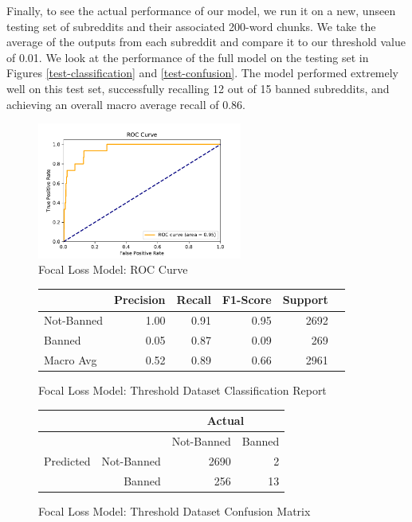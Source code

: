 \documentclass[11pt]{article}[twocolumn]
\begin{document}
Finally, to see the actual performance of our model, we run it on a new, unseen testing set of subreddits and their associated 200-word chunks. We take the average of the outputs from each subreddit and compare it to our threshold value of 0.01. We look at the performance of the full model on the testing set in Figures \ref{test-classification} and \ref{test-confusion}. The model performed extremely well on this test set, successfully recalling 12 out of 15 banned subreddits, and achieving an overall macro average recall of 0.86.


\begin{figure}[H]
    \caption{Focal Loss Model: ROC Curve}\label{roc}
    \centering
    \includegraphics[width=0.6\textwidth]{roc(2).pdf}

\end{figure}

\begin{figure}[H]
\begin{center}
\caption{Focal Loss Model: Threshold Dataset Classification Report}\label{threshold-classification}
\begin{tabular}{|l|r|r|r|r|r}
\hline
    & Precision & Recall & F1-Score & Support  \\
    \hline
    Not-Banned  & 1.00 & 0.91 & 0.95 & 2692\\
    Banned  & 0.05 & 0.87 & 0.09 & 269\\
    \hline
    Macro Avg  & 0.52 & 0.89 & 0.66 & 2961\\
    \hline
\end{tabular}
\end{center}
\end{figure}


\begin{figure}[H]
\begin{center}
\caption{Focal Loss Model: Threshold Dataset Confusion Matrix}\label{threshold-confusion}
\begin{tabular}{|r|r|r|r|}
    \hline
    & & \multicolumn{2}{c|}{Actual}\\
        \hline
    \multirow{3}{*}{Predicted} &
    & Not-Banned & Banned \\
    \hline
    & Not-Banned  & 2690 & 2\\
    & Banned  & 256 & 13\\
    \hline
\end{tabular}
\end{center}
\end{figure}
 
\end{document}
